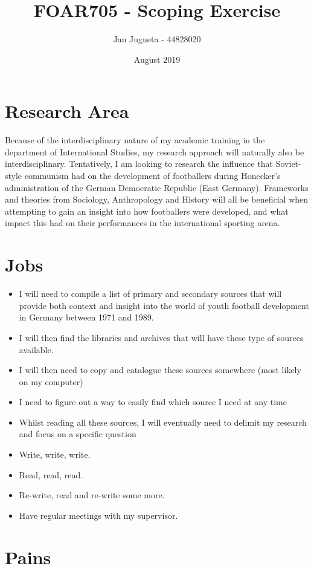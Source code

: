 \documentclass{article}
\title{FOAR705 - Scoping Exercise}
\author{Jan Jugueta - 44828020}
\date{August 2019}
\begin{document}
\maketitle

\section{Research Area}

Because of the interdisciplinary nature of my academic training in the department of International Studies, my research approach will naturally also be interdisciplinary. Tentatively, I am looking to research the influence that Soviet-style communism had on the development of footballers during Honecker's administration of the German Democratic Republic (East Germany). Frameworks and theories from Sociology, Anthropology and History will all be beneficial when attempting to gain an insight into how footballers were developed, and what impact this had on their performances in the international sporting arena.

\section{Jobs}

\begin{itemize}
  \item I will need to compile a list of primary and secondary sources that will provide both context and insight into the world of youth football development in Germany between 1971 and 1989.
  \item I will then find the libraries and archives that will have these type of sources available.
  \item I will then need to copy and catalogue these sources somewhere (most likely on my computer)
  \item I need to figure out a way to easily find which source I need at any time
  \item Whilst reading all these sources, I will eventually need to delimit my research and focus on a specific question
  \item Write, write, write.
  \item Read, read, read.
  \item Re-write, read and re-write some more.
  \item Have regular meetings with my supervisor.
\end{itemize}


\section{Pains}
\end{document}
